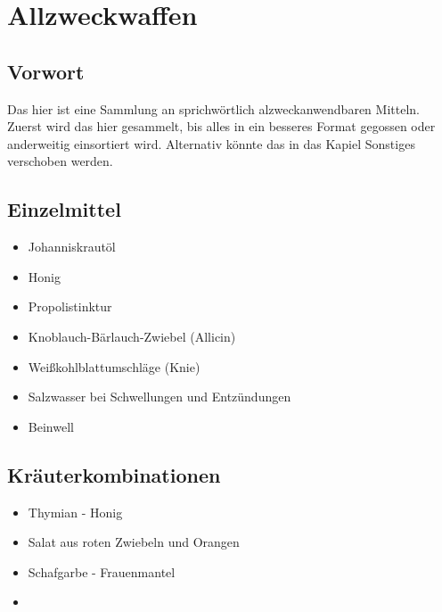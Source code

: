 \chapter{Allzweckwaffen}


\section{Vorwort}

Das hier ist eine Sammlung an sprichwörtlich alzweckanwendbaren Mitteln. Zuerst wird das hier gesammelt, bis alles in ein besseres Format gegossen oder anderweitig einsortiert wird. Alternativ könnte das in das Kapiel Sonstiges verschoben werden.
\newpage


\section{Einzelmittel}
\begin{itemize}
	\item Johanniskrautöl
	\item Honig
	\item Propolistinktur
	\item Knoblauch-Bärlauch-Zwiebel (Allicin)
	\item Weißkohlblattumschläge (Knie)
	\item Salzwasser bei Schwellungen und Entzündungen
	\item Beinwell
\end{itemize}





\section{Kräuterkombinationen}
\begin{itemize}
	\item Thymian - Honig
	\item Salat aus roten Zwiebeln und Orangen
	\item Schafgarbe - Frauenmantel
	\item 
\end{itemize}